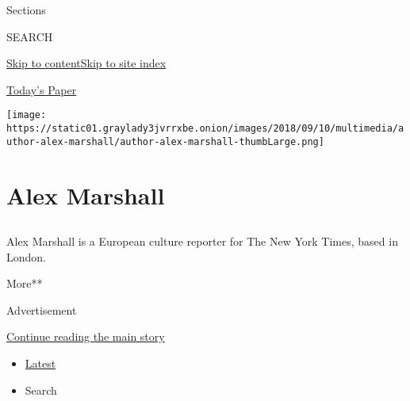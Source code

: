 Sections

SEARCH

\protect\hyperlink{site-content}{Skip to
content}\protect\hyperlink{site-index}{Skip to site index}

\href{https://myaccount.nytimes3xbfgragh.onion/auth/login?response_type=cookie\&client_id=vi}{}

\href{https://www.nytimes3xbfgragh.onion/section/todayspaper}{Today's
Paper}

\texttt{[image: https://static01.graylady3jvrrxbe.onion/images/2018/09/10/multimedia/author-alex-marshall/author-alex-marshall-thumbLarge.png]}

\hypertarget{alex-marshall}{%
\section{Alex Marshall}\label{alex-marshall}}

\subsection{}

Alex Marshall is a European culture reporter for The New York Times,
based in London.

More**

Advertisement

\protect\hyperlink{after-mid1}{Continue reading the main story}

\begin{itemize}
\tightlist
\item
  \protect\hyperlink{stream-panel}{Latest}
\item
  Search
\end{itemize}

